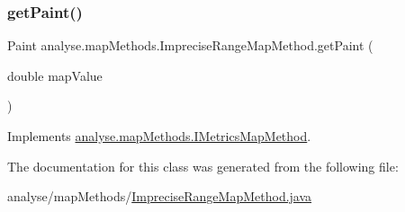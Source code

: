 \subsubsection{\texorpdfstring{get\+Paint()}{getPaint()}}
{\footnotesize\ttfamily Paint analyse.\+map\+Methods.\+Imprecise\+Range\+Map\+Method.\+get\+Paint (\begin{DoxyParamCaption}\item[{double}]{map\+Value }\end{DoxyParamCaption})\hspace{0.3cm}{\ttfamily [inline]}}



Implements \mbox{\hyperlink{interfaceanalyse_1_1map_methods_1_1_i_metrics_map_method_a102909023c32cebe3bc75052f55b24a0}{analyse.\+map\+Methods.\+I\+Metrics\+Map\+Method}}.



The documentation for this class was generated from the following file\+:\begin{DoxyCompactItemize}
\item 
analyse/map\+Methods/\mbox{\hyperlink{_imprecise_range_map_method_8java}{Imprecise\+Range\+Map\+Method.\+java}}\end{DoxyCompactItemize}
